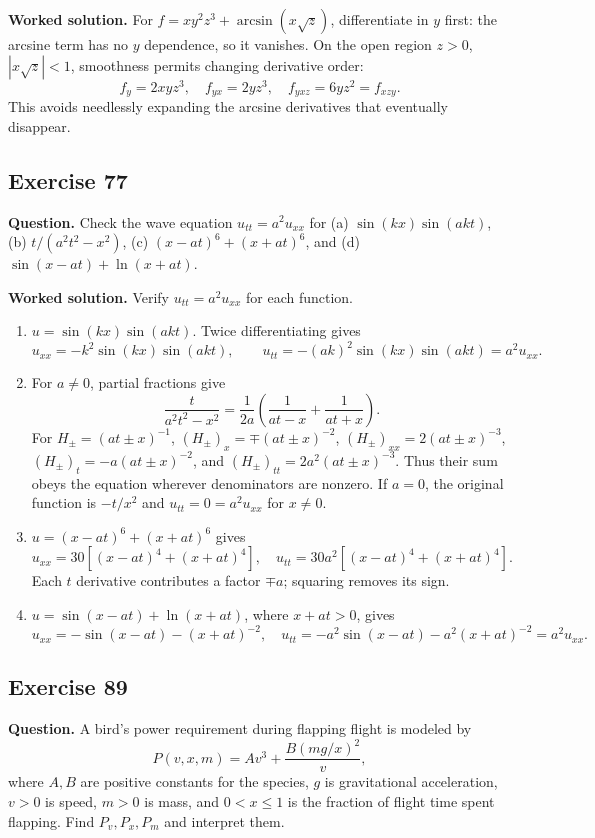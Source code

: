 \documentclass[11pt]{article}
\newcommand{\ex}[1]{\Needspace{8\baselineskip}\subsection*{Exercise #1}}
\newcommand{\ans}[1]{\boxed{#1}}
\begin{document}
\textbf{Worked solution.}
For $f=xy^2z^3+\arcsin(x\sqrt z)$, differentiate in $y$ first: the arcsine term has no $y$ dependence, so it vanishes. On the open region $z>0$, $|x\sqrt z|<1$, smoothness permits changing derivative order:
\[f_y=2xyz^3,\quad f_{yx}=2yz^3,\quad f_{yxz}=\ans{6yz^2=f_{xzy}}.\]
This avoids needlessly expanding the arcsine derivatives that eventually disappear.
\ex{77}
\textbf{Question.} Check the wave equation $u_{tt}=a^2u_{xx}$ for (a) $\sin(kx)\sin(akt)$, (b) $t/(a^2t^2-x^2)$, (c) $(x-at)^6+(x+at)^6$, and (d) $\sin(x-at)+\ln(x+at)$.

\textbf{Worked solution.}
Verify $u_{tt}=a^2u_{xx}$ for each function.
\begin{enumerate}[label=(\alph*)]
\item $u=\sin(kx)\sin(akt)$. Twice differentiating gives
\[u_{xx}=-k^2\sin(kx)\sin(akt),\qquad u_{tt}=-(ak)^2\sin(kx)\sin(akt)=a^2u_{xx}.\]
\item For $a\ne0$, partial fractions give
\[\frac{t}{a^2t^2-x^2}=\frac1{2a}\left(\frac1{at-x}+\frac1{at+x}\right).\]
For $H_\pm=(at\pm x)^{-1}$, $(H_\pm)_x=\mp(at\pm x)^{-2}$, $(H_\pm)_{xx}=2(at\pm x)^{-3}$, $(H_\pm)_t=-a(at\pm x)^{-2}$, and $(H_\pm)_{tt}=2a^2(at\pm x)^{-3}$. Thus their sum obeys the equation wherever denominators are nonzero. If $a=0$, the original function is $-t/x^2$ and $u_{tt}=0=a^2u_{xx}$ for $x\ne0$.
\item $u=(x-at)^6+(x+at)^6$ gives
\[u_{xx}=30[(x-at)^4+(x+at)^4],\quad u_{tt}=30a^2[(x-at)^4+(x+at)^4].\]
Each $t$ derivative contributes a factor $\mp a$; squaring removes its sign.
\item $u=\sin(x-at)+\ln(x+at)$, where $x+at>0$, gives
\[u_{xx}=-\sin(x-at)-(x+at)^{-2},\quad
u_{tt}=-a^2\sin(x-at)-a^2(x+at)^{-2}=a^2u_{xx}.\]
\end{enumerate}
\ex{89}
\textbf{Question.} A bird's power requirement during flapping flight is modeled by
\[P(v,x,m)=Av^3+\frac{B(mg/x)^2}{v},\]
where $A,B$ are positive constants for the species, $g$ is gravitational acceleration, $v>0$ is speed, $m>0$ is mass, and $0<x\le1$ is the fraction of flight time spent flapping. Find $P_v,P_x,P_m$ and interpret them.
\end{document}
